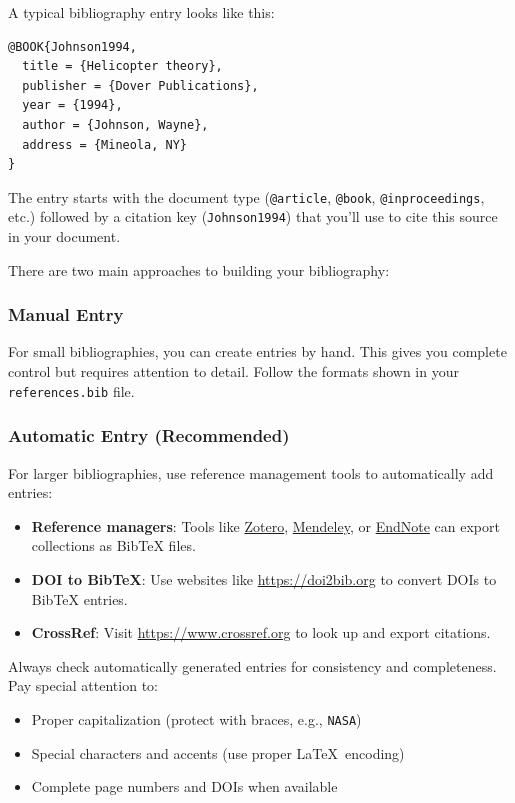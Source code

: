 A typical bibliography entry looks like this:

\begin{verbatim}    
@BOOK{Johnson1994,
  title = {Helicopter theory},
  publisher = {Dover Publications},
  year = {1994},
  author = {Johnson, Wayne},
  address = {Mineola, NY}
}
\end{verbatim}

The entry starts with the document type (\texttt{@article}, \texttt{@book}, \texttt{@inproceedings}, etc.) followed by a citation key (\texttt{Johnson1994}) that you'll use to cite this source in your document.


There are two main approaches to building your bibliography:

\subsubsection*{Manual Entry}
For small bibliographies, you can create entries by hand. This gives you complete control but requires attention to detail. Follow the formats shown in your \texttt{references.bib} file.

\subsubsection*{Automatic Entry (Recommended)}
For larger bibliographies, use reference management tools to automatically add entries:

\begin{itemize}
    \item \textbf{Reference managers}: Tools like \href{https://www.zotero.org/}{Zotero}, \href{https://www.mendeley.com/}{Mendeley}, or \href{https://endnote.com/}{EndNote} can export collections as BibTeX files.
    \item \textbf{DOI to BibTeX}: Use websites like \url{https://doi2bib.org} to convert DOIs to BibTeX entries.
    \item \textbf{CrossRef}: Visit \url{https://www.crossref.org} to look up and export citations.
\end{itemize}


Always check automatically generated entries for consistency and completeness. Pay special attention to:
\begin{itemize}
    \item Proper capitalization (protect with braces, e.g., \texttt{{NASA}})
    \item Special characters and accents (use proper \LaTeX\ encoding)
    \item Complete page numbers and DOIs when available
\end{itemize}

